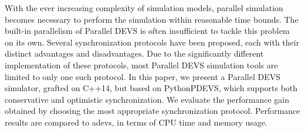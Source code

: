 With the ever increasing complexity of simulation models, parallel simulation
becomes necessary to perform the simulation within reasonable time bounds.
The built-in parallelism of Parallel DEVS is often insufficient to tackle this problem on its own.
Several synchronization protocols have been proposed, each with their distinct advantages and disadvantages.
Due to the significantly different implementation of these protocols, most Parallel DEVS simulation tools are limited to only one such protocol.
In this paper, we present a Parallel DEVS simulator, grafted on C++14, but based on PythonPDEVS, which supports both conservative and optimistic synchronization.
We evaluate the performance gain obtained by choosing the most appropriate synchronization protocol.
Performance results are compared to adevs, in terms of CPU time and memory usage.
